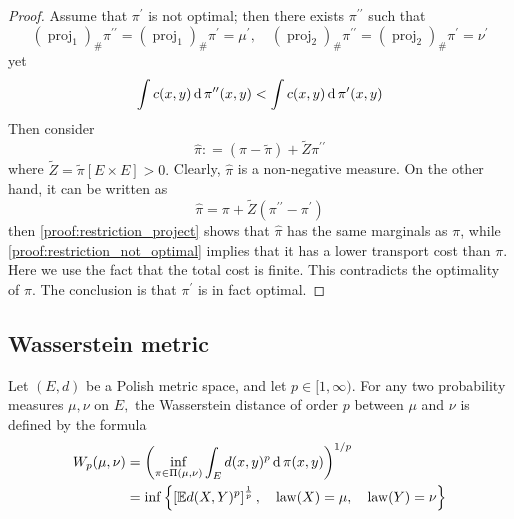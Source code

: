 \begin{proof}
	Assume that \( \pi ^ { \prime } \) is not optimal;
	then there exists
	\( \pi ^ { \prime \prime } \) such that
	\begin{equation}
		\label{proof:restriction_project}
		\left( \operatorname { proj } _ { 1 } \right) _ { \# } \pi ^ { \prime \prime } = \left( \operatorname { proj } _ { 1 } \right) _ { \# } \pi ^ { \prime } = \mu ^ { \prime },
		\quad \left( \operatorname { proj } _ { 2 } \right) _ { \# } \pi ^ { \prime \prime } = \left( \operatorname { proj } _ { 2 } \right) _ { \# } \pi ^ { \prime } = \nu ^ { \prime }
	\end{equation}
	yet
	\begin{equation}
		\label{proof:restriction_not_optimal}
		\int c ( x , y ) \operatorname{d} \pi ^ { \prime \prime } ( x , y ) < \int c ( x , y ) \operatorname{d} \pi ^ { \prime } ( x , y )
	\end{equation}
	Then consider
	\[ \widehat { \pi } : = ( \pi - \widetilde { \pi } ) + \widetilde { Z } \pi ^ { \prime \prime } \]
	where \( \widetilde { Z } = \widetilde { \pi } [ E \times E ] > 0 . \) Clearly, \( \widehat { \pi } \) is a non-negative measure. On the
	other hand, it can be written as
	\[ \widehat { \pi } = \pi + \widetilde { Z } \left( \pi ^ { \prime \prime } - \pi ^ { \prime } \right) \]
	then \cref{proof:restriction_project} shows that \( \widehat { \pi } \) has the same marginals as \( \pi \),
	while \cref{proof:restriction_not_optimal} implies that it has a lower transport cost than \( \pi \).
	Here we use the fact that the total cost is finite.
	This contradicts the optimality of \( \pi \). The conclusion
	is that \( \pi ^ { \prime } \) is in fact optimal.
\end{proof}

\subsection{Wasserstein metric}

\begin{defn}
	\label{Wasserstein_distance}
	Let  \(( E , d ) \) be a Polish metric space, and let \( p \in [ 1 , \infty ) . \) For any two probability measures \( \mu , \nu \) on \( E , \) the Wasserstein distance of order \( p \) between \( \mu \) and \( \nu \) is defined by the formula
	\begin{align*}
		W _ { p } ( \mu , \nu ) & = \left( \inf _ { \pi \in \Pi ( \mu , \nu ) } \int _ { E } d ( x , y ) ^ { p } \operatorname{d} \pi ( x , y ) \right) ^ { 1 / p }                                                              \\
		                        & = \inf \left\{ \left[ \mathbb{ E } d ( X , Y ) ^ { p } \right] ^ { \frac { 1 } { p } } , \quad \operatorname { law } ( X ) = \mu , \quad \operatorname { law } ( Y ) = \nu \right\}
	\end{align*}
\end{defn}

